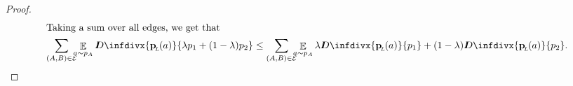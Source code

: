 \documentclass[letterpaper]{article} %
\theoremstyle{plain}
\theoremstyle{definition}
\theoremstyle{remark}
\DeclareMathOperator*{\Ex}{\mathbb{E}} %
\newcommand\mat[1]{\mathbf{#1}}
\newcommand{\thickD}{I\mkern-8muD}
\newcommand{\kldiv}{\thickD\infdivx}
\newcommand{\bp}[1][L]{\mat{p}_{\!_{#1}\!}}
\newcommand{\Ed}{\mathcal E}
\begin{document}
\begin{proof}
\begin{align*}
                        \intertext{Taking a sum over all edges, we get
                        that}
					\sum_{(A, B) \in \Ed}\mskip-10mu\Ex_{a\sim p_A} \kldiv{\bp(a) }{\lambda p_1 + (1-\lambda) p_2} 
			&\leq \sum_{(A, B) \in
							  \Ed}\mskip-10mu\Ex_{a\sim p_A}\lambda
							\kldiv{\bp(a)}{p_1} + (1-\lambda)
							\kldiv{\bp(a)}{p_2}. \\
%

\end{align*}
\end{proof}
\end{document}
